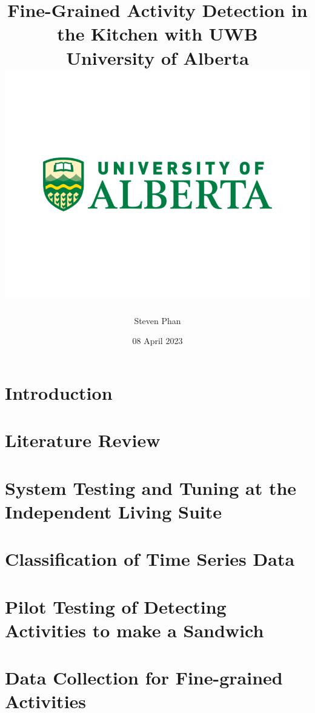 \documentclass[12pt]{report}
\title{
    {Fine-Grained Activity Detection in the Kitchen with UWB}\\
    {\large University of Alberta}\\
    {\includegraphics[width=\textwidth]{university.png}}
}
\author{Steven Phan}
\date{08 April 2023}
\begin{document}
\maketitle


\tableofcontents

\chapter{Introduction}


\chapter{Literature Review}\label{chp:lit-review}


\chapter{System Testing and Tuning at the Independent Living Suite}\label{chp:sys-tuning}


\chapter{Classification of Time Series Data}\label{chp:ts-classification}


\chapter{Pilot Testing of Detecting Activities to make a Sandwich}


\chapter{Data Collection for Fine-grained Activities}\label{chp:pass-tasks}

% 



\end{document}

